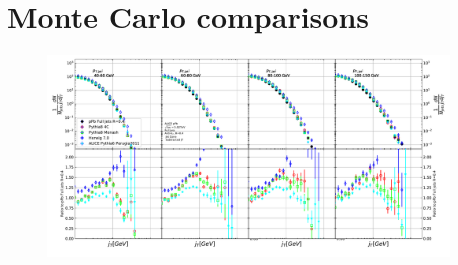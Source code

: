 
\section{Monte Carlo comparisons}
\label{app:a}

\begin{figure}
\centering

\includegraphics[width=0.95\textwidth]{figures/results/PythiaR04JetConeJtSignalPtFrom3To8.pdf}

\label{fig:fits}
\end{figure}


